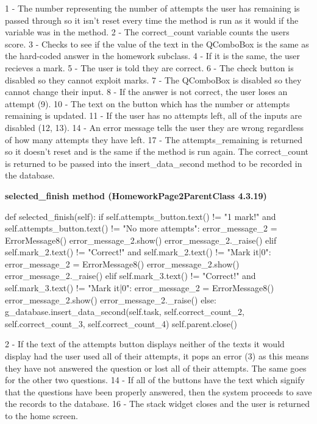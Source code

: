 1 - The number representing the number of attempts the user has remaining is passed through so it isn't reset every time the method is run as it would if the variable was in the method.
2 - The correct\_count variable counts the users score.
3 - Checks to see if the value of the text in the QComboBox is the same as the hard-coded answer in the homework subclass.
4 - If it is the same, the user recieves a mark.
5 - The user is told they are correct.
6 - The check button is disabled so they cannot exploit marks.
7 - The QComboBox is disabled so they cannot change their input.
8 - If the answer is not correct, the user loses an attempt (9).
10 - The text on the button which has the number or attempts remaining is updated.
11 - If the user has no attempts left, all of the inputs are disabled (12, 13).
14 - An error message tells the user they are wrong regardless of how many attempts they have left.
17 - The attempts\_remaining is returned so it doesn't reset and is the same if the method is run again. The correct\_count is returned to be passed into the insert\_data\_second method to be recorded in the database.

\textbf{selected\_finish method (HomeworkPage2ParentClass 4.3.19)}

\begin{python}
def selected_finish(self):
        if self.attempts_button.text() != "1 mark!" and self.attempts_button.text() != "No more attempts":
            error_message_2 = ErrorMessage8()
            error_message_2.show()
            error_message_2._raise()
        elif self.mark_2.text() != "Correct!" and self.mark_2.text() != "Mark it|0":
            error_message_2 = ErrorMessage8()
            error_message_2.show()
            error_message_2._raise()
        elif self.mark_3.text() != "Correct!" and self.mark_3.text() != "Mark it|0":
            error_message_2 = ErrorMessage8()
            error_message_2.show()
            error_message_2._raise()
        else:
            g_database.insert_data_second(self.task, self.correct_count_2, self.correct_count_3, self.correct_count_4)
            self.parent.close()
\end{python}

2 - If the text of the attempts button displays neither of the texts it would display had the user used all of their attempts, it pops an error (3) as this means they have not answered the question or lost all of their attempts. The same goes for the other two questions.
14 - If all of the buttons have the text which signify that the questions have been properly answered, then the system proceeds to save the records to the database.
16 - The stack widget closes and the user is returned to the home screen.

